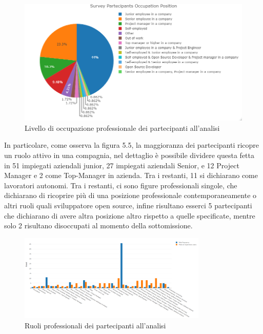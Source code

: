     \begin{figure}[h!]
        \centering
        \includegraphics[width=1\textwidth]{figure/Analisi/Background/Survey_Partecipants_Occupation_Position.png}
        \caption{Livello di occupazione professionale dei partecipanti all'analisi}
    \end{figure}
    
    In particolare, come osserva la figura 5.5, la maggioranza dei partecipanti ricopre un ruolo attivo in una compagnia, nel dettaglio è possibile dividere questa fetta in 51 impiegati aziendali junior, 27 impiegati aziendali Senior, e 12 Project Manager e 2 come Top-Manager  in azienda. Tra i restanti, 11 si dichiarano come lavoratori autonomi. Tra i restanti, ci sono figure professionali singole, che dichiarano di ricoprire più di una posizione professionale contemporaneamente o altri ruoli quali sviluppatore open source, infine risultano esserci 5 partecipanti che dichiarano di avere altra posizione altro rispetto a quelle specificate, mentre solo 2 risultano disoccupati al momento della sottomissione.  
    
      \begin{figure}[h!]
        \centering
        \includegraphics[width=0.8\textwidth]{figure/Analisi/Background/Survey_Partecipants_Roles.png}
        
        \caption{Ruoli professionali dei partecipanti all'analisi}
    \end{figure}
    
